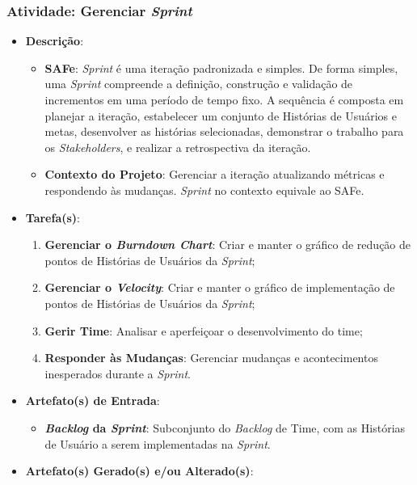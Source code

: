 			\subsubsection[Atividade: Gerenciar \emph{Sprint}]{Atividade: Gerenciar \emph{Sprint}}
			\label{subsubsec:processo_atividade_time_gerenciar_sprint}
				\begin{itemize}
					\item{\textbf{Descrição}:
						\begin{itemize}
							\item{\textbf{SAFe}: \emph{Sprint} é uma iteração padronizada e simples. De forma simples, uma \emph{Sprint} compreende a definição, construção e validação de incrementos em uma período de tempo fixo. A sequência é composta em planejar a iteração, estabelecer um conjunto de Histórias de Usuários e metas, desenvolver as histórias selecionadas, demonstrar o trabalho para os \emph{Stakeholders}, e realizar a retrospectiva da iteração.}
							\item{\textbf{Contexto do Projeto}: Gerenciar a iteração atualizando métricas e respondendo às mudanças. \emph{Sprint} no contexto equivale ao SAFe.}
						\end{itemize}}
					\item{\textbf{Tarefa(s)}:
						\begin{enumerate}
							\item{\textbf{Gerenciar o \emph{Burndown Chart}}: Criar e manter o gráfico de redução de pontos de Histórias de Usuários da \emph{Sprint};}
							\item{\textbf{Gerenciar o \emph{Velocity}}: Criar e manter o gráfico de implementação de pontos de Histórias de Usuários da \emph{Sprint};}
							\item{\textbf{Gerir Time}: Analisar e aperfeiçoar o desenvolvimento do time;}
							\item{\textbf{Responder às Mudanças}: Gerenciar mudanças e acontecimentos inesperados durante a \emph{Sprint}.}
						\end{enumerate}}
					\item{\textbf{Artefato(s) de Entrada}:
						\begin{itemize}
							\item{\textbf{\emph{Backlog} da \emph{Sprint}}: Subconjunto do \emph{Backlog} de Time, com as Histórias de Usuário a serem implementadas na \emph{Sprint}.}
						\end{itemize}}
					\item{\textbf{Artefato(s) Gerado(s) e/ou Alterado(s)}:
}
\end{itemize}
